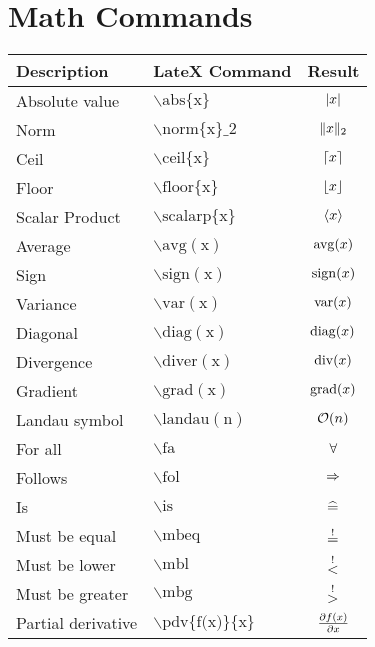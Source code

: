 \documentclass[
  a4paper, 
  fontsize=12pt, 
  titlepage, 
  listof=totocnumbered, 
  index=totoc,        
  bibliography=totocnumbered, 
  numbers=noenddot
]{scrartcl}
\begin{document}
\section{Math Commands}

  \begin{tabular}{l  l  c}
    \toprule
      Description & LateX Command & Result \\[3pt]
    \midrule
      Absolute value & $\backslash \text{abs}\lbrace \text{x} \rbrace$ & $\lvert x\rvert$ \\[3pt]
      Norm & $\backslash \text{norm}\lbrace \text{x} \rbrace\_2$ & $\lVert x\rVert_2$ \\[3pt]
      Ceil & $\backslash \text{ceil}\lbrace \text{x} \rbrace$ & $\lceil x\rceil$ \\[3pt]
      Floor & $\backslash \text{floor}\lbrace \text{x} \rbrace$ & $\lfloor x\rfloor$ \\[3pt]
      Scalar Product & $\backslash \text{scalarp}\lbrace \text{x} \rbrace$ & $\langle x\rangle$ \\[3pt]
      Average & $\backslash \text{avg}( \text{x} )$ & $\operatorname{avg}(x)$ \\[3pt]
      Sign & $\backslash \text{sign}( \text{x} )$ & $\operatorname{sign}(x)$ \\[3pt]
      Variance & $\backslash \text{var}( \text{x} )$ & $\operatorname{var}(x)$ \\[3pt]
      Diagonal & $\backslash \text{diag}( \text{x} )$ & $\operatorname{diag}(x)$ \\[3pt]
      Divergence & $\backslash \text{diver}( \text{x} )$ & $\operatorname{div}(x)$ \\[3pt]
      Gradient & $\backslash \text{grad}( \text{x} )$ & $\operatorname{grad}(x)$ \\[3pt]
      Landau symbol & $\backslash \text{landau}( \text{n} )$ & $\operatorname{\mathcal{O}}(n)$ \\[3pt]
      \midrule
      For all & $\backslash \text{fa}$ & $\forall$ \\[3pt]
      Follows & $\backslash \text{fol}$ & $\Rightarrow$ \\[3pt]
      Is & $\backslash \text{is}$ & $\widehat{=}$ \\[3pt]
      Must be equal & $\backslash \text{mbeq}$ & $\overset{!}{=}$ \\[3pt]
      Must be lower & $\backslash \text{mbl}$ & $\overset{!}{<}$ \\[3pt]
      Must be greater & $\backslash \text{mbg}$ & $\overset{!}{>}$ \\[3pt]
      Partial derivative & $\backslash \text{pdv}\lbrace \text{f(x)} \rbrace\lbrace \text{x} \rbrace$ & $\frac{\partial f(x)}{\partial x}$ \\[3pt]

\end{tabular}
\end{document}
